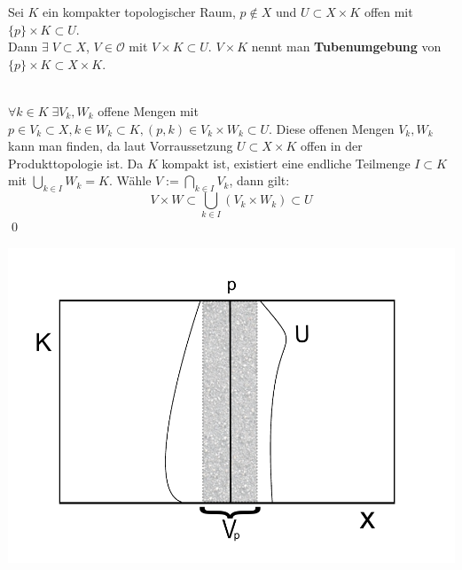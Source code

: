 \begin{Lemma}[Tubenlemma]
	Sei \(K \) ein kompakter topologischer Raum,  \(p \notin X \) und \( U \subset X \times K \) offen mit \( \{p\} \times K \subset U \). \\
	Dann \( \exists \; V \subset X \), \( V \in \mathcal{O} \) mit \( V \times K \subset U \). \( V \times K \) nennt man { \bf Tubenumgebung } von 
	\( \{p\} \times K \subset X \times K \).
\end{Lemma} 
%
	\\
	\( \forall k \in K \; \exists V_{k}, W_{k}\) offene Mengen mit \( p \in V_{k} \subset X, k \in W_{k} \subset K, (p,k) \in  V_{k} \times W_{k} \subset U\).
	Diese offenen Mengen \(V_{k}, W_{k}\) kann man finden, da laut Vorraussetzung \(U  \subset X \times K \) offen in der Produkttopologie ist.
	Da \(K \) kompakt ist, existiert eine endliche Teilmenge
	\( I \subset K \) mit \( \bigcup_{ k \in I } W_{k} = K \). Wähle \(V := \bigcap_{ k \in I } V_{k} \), dann gilt:
	\[ V \times W \subset \bigcup_{k \in I} (V_{k} \times W_{k}) \subset U \]
\qed
	
\includegraphics{tubenlemma.pdf} 
	
